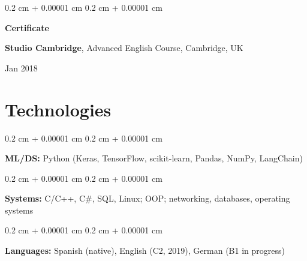 \documentclass[10pt, letterpaper]{article}
\newenvironment{onecolentry}{
    \begin{adjustwidth}{
        0.2 cm + 0.00001 cm
    }{
        0.2 cm + 0.00001 cm
    }
}{
    \end{adjustwidth}
} %
\newenvironment{threecolentry}[3][]{
    \onecolentry
    \def\thirdColumn{#3}
    \setcolumnwidth{1 cm, \fill, 4.5 cm}
    \begin{paracol}{3}
    {\raggedright #2} \switchcolumn
}{
    \switchcolumn \raggedleft \thirdColumn
    \end{paracol}
    \endonecolentry
} %
\begin{document}
        \vspace{0.1 cm}

        \begin{threecolentry}{\textbf{Certificate}}{
            Jan 2018
        }
            \textbf{Studio Cambridge}, Advanced English Course, Cambridge, UK
        \end{threecolentry}

    \section{Technologies}

        \begin{onecolentry}
            \textbf{ML/DS:} Python (Keras, TensorFlow, scikit-learn, Pandas, NumPy, LangChain)
        \end{onecolentry}

        \vspace{0.1 cm}

        \begin{onecolentry}
            \textbf{Systems:} C/C++, C\#, SQL, Linux; OOP; networking, databases, operating systems
        \end{onecolentry}

        \vspace{0.1 cm}

        \begin{onecolentry}
            \textbf{Languages:} Spanish (native), English (C2, 2019), German (B1 in progress)
        \end{onecolentry}
\end{document}
